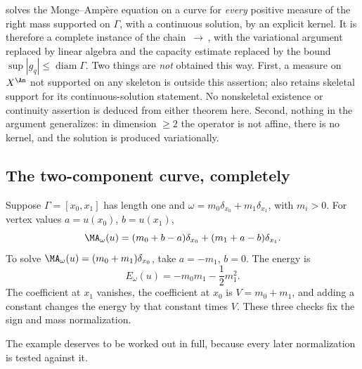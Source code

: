 \begin{remark}
\label{rem:ch31-curve-solution-scope}
 solves the Monge--Amp\`ere equation on a
curve for \emph{every} positive measure of the right mass supported on
\(\Gamma\), with a continuous solution, by an explicit kernel.  It is
therefore a complete instance of the chain
\,\(\to\)\,,
with the variational argument replaced by linear algebra and the capacity
estimate replaced by the bound \(\sup|g_q|\leq\operatorname{diam}\Gamma\).
Two things are \emph{not} obtained this way.  First, a measure on
\(X^{\An}\) not supported on any skeleton is outside this assertion;
 also retains skeletal support
for its continuous-solution statement.  No nonskeletal existence or
continuity assertion is deduced from either theorem here.
Second, nothing in the argument generalizes: in dimension
\(\geq2\) the operator is not affine, there is no kernel, and the solution
is produced variationally.
\end{remark}

\subsection{The two-component curve, completely}
\label{sec:ch31-two-component}

\begin{example}
\label{ex:two-component-complete}
Suppose \(\Gamma=[x_0,x_1]\) has length one and
\(\omega=m_0\delta_{x_0}+m_1\delta_{x_1}\), with \(m_i>0\).  For vertex
values \(a=u(x_0)\), \(b=u(x_1)\),
\begin{equation}
 \MA_\omega(u)
 =(m_0+b-a)\delta_{x_0}+(m_1+a-b)\delta_{x_1}.
\label{eq:two-component-ma}
\end{equation}
To solve \(\MA_\omega(u)=(m_0+m_1)\delta_{x_0}\), take
\(a=-m_1\), \(b=0\).  The energy is
\begin{equation}
 E_\omega(u)
 =-m_0m_1-\frac12m_1^2.
\label{eq:two-component-energy}
\end{equation}
The coefficient at \(x_1\) vanishes, the coefficient at \(x_0\) is
\(V=m_0+m_1\), and adding a constant changes the energy by that constant
times \(V\).  These three checks fix the sign and mass normalization.
\end{example}

The example deserves to be worked out in full, because every later
normalization is tested against it.

